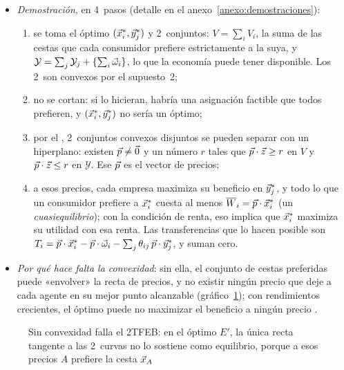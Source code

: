 \documentclass[11pt]{article}
\begin{document}
\begin{itemize}
\item \emph{Demostración}, en 4~pasos\nocite{MasColellWhinstonGreen1995} (detalle en el anexo~\ref{anexo:demostraciones}):
  \begin{enumerate}
  \item se toma el óptimo $(\vec{x}^*_i,\vec{y}^*_j)$ y 2~conjuntos: $V=\sum_iV_i$, la suma de las cestas que cada consumidor prefiere estrictamente a la suya, y $\mathcal{Y}=\sum_j\mathcal{Y}_j+\{\sum_i\vec{\omega}_i\}$, lo que la economía puede tener disponible. Los 2~son convexos por el supuesto~2;
  \item no se cortan: si lo hicieran, habría una asignación factible que todos prefieren, y $(\vec{x}^*_i,\vec{y}^*_j)$ no sería un óptimo;
  \item por el \nocite{Minkowski1911Theorie}, 2~conjuntos convexos disjuntos se pueden separar con un hiperplano: existen $\vec{p}\neq\vec{0}$ y un número $r$ tales que $\vec{p}\cdot\vec{z}\geq r$ en $V$ y $\vec{p}\cdot\vec{z}\leq r$ en $\mathcal{Y}$. Ese $\vec{p}$ es el vector de precios;
  \item a esos precios, cada empresa maximiza su beneficio en $\vec{y}^*_j$, y todo lo que un consumidor prefiere a $\vec{x}^*_i$ cuesta al menos $\overline{W}_i=\vec{p}\cdot\vec{x}^*_i$ (un \emph{cuasiequilibrio}); con la condición de renta, eso implica que $\vec{x}^*_i$ maximiza su utilidad con esa renta. Las transferencias que lo hacen posible son $T_i=\vec{p}\cdot\vec{x}^*_i-\vec{p}\cdot\vec{\omega}_i-\sum_j\theta_{ij}\,\vec{p}\cdot\vec{y}^*_j$, y suman cero.\findemo
  \end{enumerate}
\item \emph{Por qué hace falta la convexidad}: sin ella, el conjunto de cestas preferidas puede «envolver» la recta de precios, y no existir ningún precio que deje a cada agente en su mejor punto alcanzable (gráfico~\ref{fig:segundo-teorema-no-convexo}); con rendimientos crecientes, el óptimo puede no maximizar el beneficio a ningún precio .
\end{itemize}

\begin{figure}[H]
\centering
\caption{Sin convexidad falla el 2TFEB: en el óptimo $E'$, la única recta tangente a las 2~curvas no lo sostiene como equilibrio, porque a esos precios $A$ prefiere la cesta $\vec{x}_A$}\label{fig:segundo-teorema-no-convexo}
\end{figure}
\end{document}
